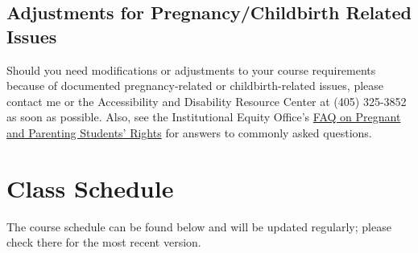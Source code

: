 \documentclass[11pt,english]{article}
\begin{document}
\subsection*{Adjustments for Pregnancy/Childbirth Related Issues}

Should you need modifications or adjustments to your course requirements because of documented pregnancy-related or childbirth-related issues, please contact me or the Accessibility and Disability Resource Center at (405) 325-3852 as soon as possible. Also, see the Institutional Equity Office's \href{http://www.ou.edu/eoo/faqs/pregnancy-faqs.html}{FAQ on Pregnant and Parenting Students' Rights} for answers to commonly asked questions.

\section*{Class Schedule}
The course schedule can be found below and will be updated regularly; please check there for the most recent version.
\end{document}
